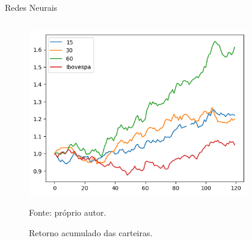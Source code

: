     \begin{frame}{Redes Neurais}
        
        \begin{columns}
            \begin{column}{0.5\textwidth}

                \begin{figure}[htbp]
                    \centering
                    \caption{Retorno acumulado das carteiras.}
                    \label{fig:retorno_acumulado}
                    \includegraphics[width=0.9\textwidth]{./images/retorno_acumulado.png}
                    \par \footnotesize Fonte: próprio autor.
                \end{figure}

            \end{column}

            \begin{column}{0.5\textwidth}


\end{column}
\end{columns}
\end{frame}
